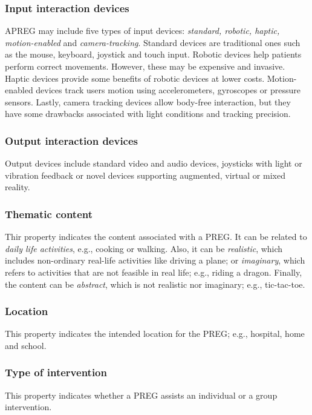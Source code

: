 \subsubsection{Input interaction devices}
A\ac{PREG} may include five types of input devices: \textit{standard, robotic, haptic, motion-enabled} and \textit{camera-tracking}. Standard devices are traditional ones such as the mouse, keyboard, joystick and touch input. Robotic devices help patients perform correct movements. However, these may be expensive and invasive. Haptic devices provide some benefits of robotic devices at lower costs. Motion-enabled devices track users motion using accelerometers, gyroscopes or pressure sensors. Lastly, camera tracking devices allow body-free interaction, but they have some drawbacks associated with light conditions and tracking precision.
    
\subsubsection{Output interaction devices}
Output devices include standard video and audio devices, joysticks with light or vibration feedback or novel devices supporting augmented, virtual or mixed reality.
    
\subsubsection{Thematic content}
Thir property indicates the content associated with a \ac{PREG}. It can be related to \textit{daily life activities}, e.g., cooking or walking. Also, it can be \textit{realistic}, which includes non-ordinary real-life activities like driving a plane; or \textit{imaginary}, which refers to activities that are not feasible in real life; e.g., riding a dragon. Finally, the content can be \textit{abstract}, which is not realistic nor imaginary; e.g., tic-tac-toe.
    
\subsubsection{Location}
This property indicates the intended location for the \ac{PREG}; e.g., hospital, home and school.
    
\subsubsection{Type of intervention}
This property indicates whether a \ac{PREG} assists an individual or a group intervention.

